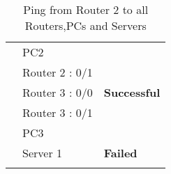 \documentclass[a4paper,11pt]{article}
\begin{document}
\begin{enumerate}
\begin{enumerate}
\begin{table}[H]
\begin{tabular}{| m{9em}| m{12em}| m{9em} |}
                            {\cellcolor[rgb]{0.333,0.686,1}}                                     & PC2                  & {\cellcolor[rgb]{0.376,1,0.882}}                                                        \\
                            \hhline{>{\arrayrulecolor{black}}|>{\arrayrulecolor[rgb]{0.333,0.686,1}}->{\arrayrulecolor{black}}->{\arrayrulecolor[rgb]{0.376,1,0.882}}-}
                            {\cellcolor[rgb]{0.333,0.686,1}}                                     & Router 2 : 0/1       & {\cellcolor[rgb]{0.376,1,0.882}}                                                        \\
                            \hhline{>{\arrayrulecolor{black}}|>{\arrayrulecolor[rgb]{0.333,0.686,1}}->{\arrayrulecolor{black}}->{\arrayrulecolor[rgb]{0.376,1,0.882}}-}
                            {\cellcolor[rgb]{0.333,0.686,1}}                                     & Router 3 : 0/0       & \multirow{-5}{*}{{\cellcolor[rgb]{0.376,1,0.882}}\textbf{Successful}}                   \\
                            \hhline{>{\arrayrulecolor{black}}|>{\arrayrulecolor[rgb]{0.333,0.686,1}}->{\arrayrulecolor{black}}->{\arrayrulecolor[rgb]{1,0.141,0.059}}-}
                            {\cellcolor[rgb]{0.333,0.686,1}}                                     & Router 3 : 0/1       & {\cellcolor[rgb]{1,0.141,0.059}}                                                        \\
                            \hhline{>{\arrayrulecolor{black}}|>{\arrayrulecolor[rgb]{0.333,0.686,1}}->{\arrayrulecolor{black}}->{\arrayrulecolor[rgb]{1,0.141,0.059}}-}
                            {\cellcolor[rgb]{0.333,0.686,1}}                                     & PC3                  & {\cellcolor[rgb]{1,0.141,0.059}}                                                        \\
                            \hhline{>{\arrayrulecolor{black}}|>{\arrayrulecolor[rgb]{0.333,0.686,1}}->{\arrayrulecolor{black}}->{\arrayrulecolor[rgb]{1,0.141,0.059}}-}
                            \multirow{-16}{*}{{\cellcolor[rgb]{0.333,0.686,1}}\textbf{Router 2}} & Server 1             & \multirow{-3}{*}{{\cellcolor[rgb]{1,0.141,0.059}}\textbf{Failed}}                       \\
                            \hhline{>{\arrayrulecolor{black}}|-->{\arrayrulecolor[rgb]{1,0.141,0.059}}-}
                        \end{tabular}
                        \caption{Ping from Router 2 to all Routers,PCs and Servers }
                    \end{table}



\end{enumerate}
\end{enumerate}
\end{document}
